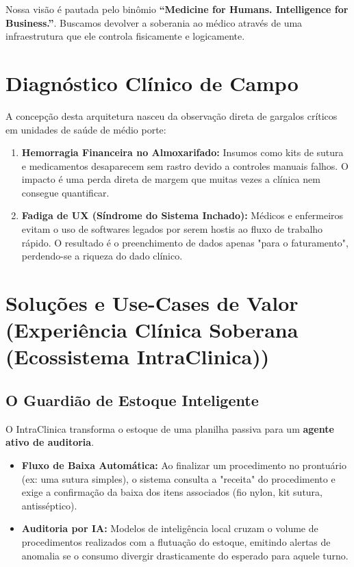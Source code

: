 \documentclass[11pt,a4paper,oneside]{article}
\begin{document}
Nossa visão é pautada pelo binômio \textbf{``Medicine for Humans. Intelligence for Business.''}. Buscamos devolver a soberania ao médico através de uma infraestrutura que ele controla fisicamente e logicamente.

\section{Diagnóstico Clínico de Campo}
A concepção desta arquitetura nasceu da observação direta de gargalos críticos em unidades de saúde de médio porte:

\begin{enumerate}
    \item \textbf{Hemorragia Financeira no Almoxarifado:} Insumos como kits de sutura e medicamentos desaparecem sem rastro devido a controles manuais falhos. O impacto é uma perda direta de margem que muitas vezes a clínica nem consegue quantificar.
    \item \textbf{Fadiga de UX (Síndrome do Sistema Inchado):} Médicos e enfermeiros evitam o uso de softwares legados por serem hostis ao fluxo de trabalho rápido. O resultado é o preenchimento de dados apenas "para o faturamento", perdendo-se a riqueza do dado clínico.
\end{enumerate}

\section{Soluções e Use-Cases de Valor (Experiência Clínica Soberana (Ecossistema IntraClinica))}

\subsection{O Guardião de Estoque Inteligente}
O IntraClinica transforma o estoque de uma planilha passiva para um \textbf{agente ativo de auditoria}.
\begin{itemize}
    \item \textbf{Fluxo de Baixa Automática:} Ao finalizar um procedimento no prontuário (ex: uma sutura simples), o sistema consulta a "receita" do procedimento e exige a confirmação da baixa dos itens associados (fio nylon, kit sutura, antisséptico).
    \item \textbf{Auditoria por IA:} Modelos de inteligência local cruzam o volume de procedimentos realizados com a flutuação do estoque, emitindo alertas de anomalia se o consumo divergir drasticamente do esperado para aquele turno.
\end{itemize}
\end{document}
